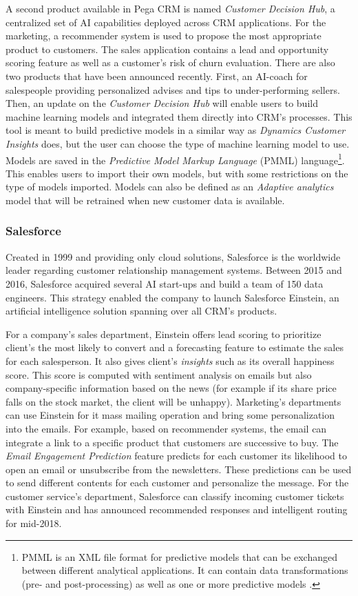 A second product available in Pega CRM is named \textit{Customer Decision Hub}, a centralized set of AI capabilities deployed across CRM applications. For the marketing, a recommender system is used to propose the most appropriate product to customers. The sales application contains a lead and opportunity scoring feature as well as a customer's risk of churn evaluation. There are also two products that have been announced recently. First, an AI-coach for salespeople providing personalized advises and tips to under-performing sellers. Then, an update on the \textit{Customer Decision Hub} will enable users to build machine learning models and integrated them directly into CRM's processes. This tool is meant to build predictive models in a similar way as \textit{Dynamics Customer Insights} does, but the user can choose the type of machine learning model to use. Models are saved in the \textit{Predictive Model Markup Language} (PMML) language\footnote{PMML is an XML file format for predictive models that can be exchanged between different analytical applications. It can contain data transformations (pre- and post-processing) as well as one or more predictive models \cite{pmml}.}. This enables users to import their own models, but with some restrictions on the type of models imported. Models can also be defined as an \textit{Adaptive analytics} model that will be retrained when new customer data is available.

\subsubsection*{Salesforce}
Created in 1999 and providing only cloud solutions, Salesforce is the worldwide leader regarding customer relationship management systems. Between 2015 and 2016, Salesforce acquired several AI start-ups and build a team of 150 data engineers. This strategy enabled the company to launch Salesforce Einstein, an artificial intelligence solution spanning over all CRM's products.

For a company's sales department, Einstein offers lead scoring to prioritize client's the most likely to convert and a forecasting feature to estimate the sales for each salesperson. It also gives client's \textit{insights} such as its overall happiness score. This score is computed with sentiment analysis on emails but also company-specific information based on the news (for example if its share price falls on the stock market, the client will be unhappy). Marketing's departments can use Einstein for it mass mailing operation and bring some personalization into the emails. For example, based on recommender systems, the email can integrate a link to a specific product that customers are successive to buy. The \textit{Email Engagement Prediction} feature predicts for each customer its likelihood to open an email or unsubscribe from the newsletters. These predictions can be used to send different contents for each customer and personalize the message. For the customer service's department, Salesforce can classify incoming customer tickets with Einstein and has announced recommended responses and intelligent routing for mid-2018.

